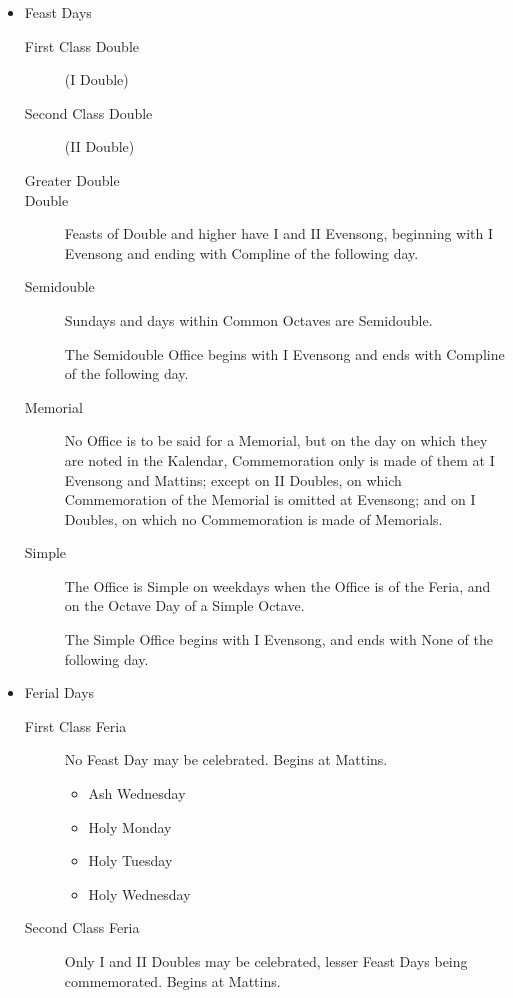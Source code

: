 \begin{itemize}
    \item Feast Days
        \begin{description}
            \item[First Class Double] (I Double)
            \item[Second Class Double] (II Double)
            \item[Greater Double]
            \item[Double] Feasts of Double and higher have I and II Evensong, beginning with I Evensong and ending with Compline of the following day.
            \item[Semidouble] Sundays and days within Common Octaves are Semidouble.\par
            The Semidouble Office begins with I Evensong and ends with Compline of the following day.
            \item[Memorial] No Office is to be said for a Memorial, but on the day on which they are noted in the Kalendar, Commemoration only is made of them at I Evensong and Mattins; except on II Doubles, on which Commemoration of the Memorial is omitted at Evensong; and on I Doubles, on which no Commemoration is made of Memorials.
            \item[Simple] The Office is Simple on weekdays when the Office is of the Feria, and on the Octave Day of a Simple Octave.\par
                The Simple Office begins with I Evensong, and ends with None of the following day.
        \end{description}
    \item Ferial Days
        \begin{description}
            \item[First Class Feria] No Feast Day may be celebrated. Begins at Mattins.
                \begin{itemize}
                    \item Ash Wednesday
                    \item Holy Monday
                    \item Holy Tuesday
                    \item Holy Wednesday
                \end{itemize}
            \item[Second Class Feria] Only I and II Doubles may be celebrated, lesser Feast Days being commemorated. Begins at Mattins.

\end{description}
\end{itemize}
